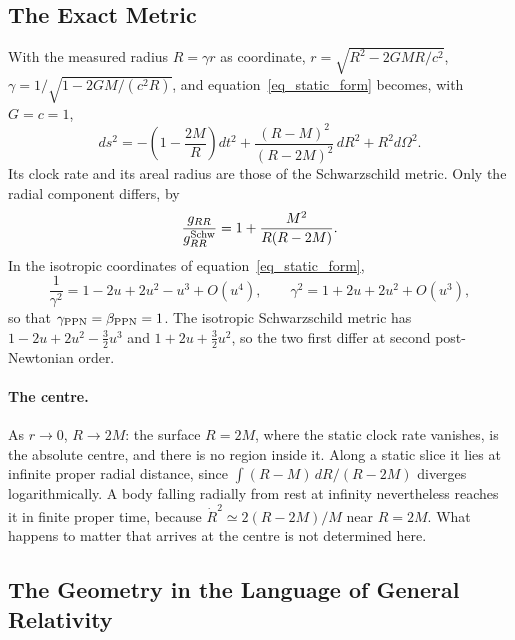 \documentclass{iopjournal}
\begin{document}
\subsection{The Exact Metric}\label{sec_exact_metric}

With the measured radius $R=\gamma r$ as coordinate, $r=\sqrt{R^2-2GMR/c^2}$, $\gamma=1/\sqrt{1-2GM/(c^2R)}$, and equation~\eqref{eq_static_form} becomes, with $G=c=1$,
\begin{equation}\label{eq_coexp_areal}
    ds^2=-\left(1-\frac{2M}{R}\right)dt^2+\frac{(R-M)^2}{(R-2M)^2}\,dR^2+R^2d\Omega^2 .
\end{equation}
Its clock rate and its areal radius are those of the Schwarzschild metric. Only the radial component differs, by
\begin{equation}\label{eq_grr_ratio}
    \frac{g_{RR}}{g_{RR}^{\rm Schw}}=1+\frac{M^2}{R(R-2M)} .
\end{equation}
In the isotropic coordinates of equation~\eqref{eq_static_form},
\begin{equation}\label{eq_ppn_expansion}
    \frac{1}{\gamma^2}=1-2u+2u^2-u^3+O(u^4),
    \qquad
    \gamma^2=1+2u+2u^2+O(u^3),
\end{equation}
so that $\gamma_{\rm PPN}=\beta_{\rm PPN}=1$. The isotropic Schwarzschild metric has $1-2u+2u^2-\tfrac32u^3$ and $1+2u+\tfrac32u^2$, so the two first differ at second post-Newtonian order.

\paragraph{The centre.} As $r\to0$, $R\to2M$: the surface $R=2M$, where the static clock rate vanishes, is the absolute centre, and there is no region inside it. Along a static slice it lies at infinite proper radial distance, since $\int(R-M)\,dR/(R-2M)$ diverges logarithmically. A body falling radially from rest at infinity nevertheless reaches it in finite proper time, because $\dot R^2\simeq2(R-2M)/M$ near $R=2M$. What happens to matter that arrives at the centre is not determined here.

\subsection{The Geometry in the Language of General Relativity}\label{sec_effective_source}
\end{document}
